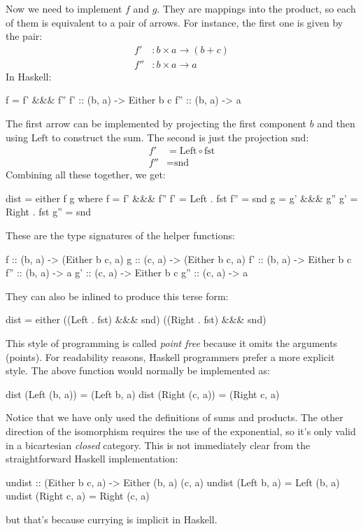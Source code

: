 \documentclass[DaoFP]{subfiles}
\begin{document}
Now we need to implement $f$ and $g$. They are mappings into the product, so each of them is equivalent to a pair of arrows. For instance, the first one is given by the pair:
\begin{align*}
f' &\colon b \times a \to (b + c) \\
f'' &\colon b \times a \to  a
\end{align*}
In Haskell:
\begin{haskell}
    f = f' &&& f''
    f'  :: (b, a) -> Either b c
    f'' :: (b, a) -> a
\end{haskell}
The first arrow can be implemented by projecting the first component $b$ and then using $\text{Left}$ to construct the sum. The second is just the projection $\text{snd}$:
\begin{align*}
 f' &= \text{Left} \circ \text{fst} \\
 f'' &= \text{snd}
\end{align*}
Combining all these together, we get:
\begin{haskell}
dist = either f g
  where
    f   = f' &&& f''
    f'  = Left . fst
    f'' = snd
    g   = g' &&& g''
    g'  = Right . fst
    g'' = snd
\end{haskell}
These are the type signatures of the helper functions:
\begin{haskell}
    f   :: (b, a) -> (Either b c, a)
    g   :: (c, a) -> (Either b c, a)
    f'  :: (b, a) -> Either b c
    f'' :: (b, a) -> a
    g'  :: (c, a) -> Either b c
    g'' :: (c, a) -> a
\end{haskell}
They can also be inlined to produce this terse form:
\begin{haskell}
dist = either ((Left . fst) &&& snd) ((Right . fst) &&& snd)
\end{haskell}

This style of programming is called \emph{point free} because it omits the arguments (points). For readability reasons, Haskell programmers prefer a more explicit style. The above function would normally be implemented as:
\begin{haskell}
dist (Left  (b, a)) = (Left  b, a)
dist (Right (c, a)) = (Right c, a)
\end{haskell}

Notice that we have only used the definitions of sums and products. The other direction of the isomorphism requires the use of the exponential, so it's only valid in a bicartesian \emph{closed} category. This is not immediately clear from the straightforward Haskell implementation:
\begin{haskell}
undist :: (Either b c, a) -> Either (b, a) (c, a)
undist (Left b, a)  = Left (b, a)
undist (Right c, a) = Right (c, a)
\end{haskell}
but that's because currying is implicit in Haskell. 
\end{document}
